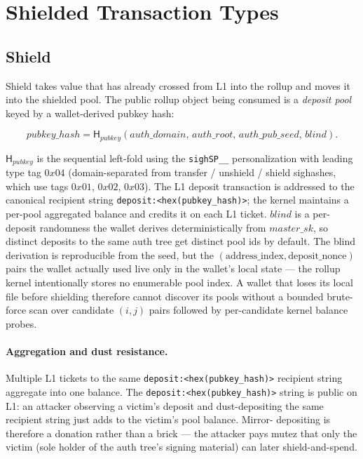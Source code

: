 \documentclass[11pt]{article}
\newcommand{\Hash}{\mathsf{H}}
\begin{document}
\section{Shielded Transaction Types}

\subsection{Shield}

Shield takes value that has already crossed from L1 into the rollup and moves it
into the shielded pool. The public rollup object being consumed is a
\emph{deposit pool} keyed by a wallet-derived pubkey hash:

\[
pubkey\_hash = \Hash_{pubkey}(auth\_domain,\, auth\_root,\, auth\_pub\_seed,\, blind).
\]

\(\Hash_{pubkey}\) is the sequential left-fold using the \texttt{sighSP\_\_}
personalization with leading type tag \(0x04\) (domain-separated from
transfer / unshield / shield sighashes, which use tags \(0x01\), \(0x02\),
\(0x03\)). The L1 deposit transaction is addressed to the canonical
recipient string \texttt{deposit:<hex(pubkey\_hash)>}; the kernel
maintains a per-pool aggregated balance and credits it on each L1 ticket.
\(blind\) is a per-deposit randomness the wallet derives
deterministically from \(master\_sk\), so distinct deposits to the
same auth tree get distinct pool ids by default. The blind derivation
is reproducible from the seed, but the
\((\textrm{address\_index}, \textrm{deposit\_nonce})\) pairs the wallet
actually used live only in the wallet's local state — the rollup
kernel intentionally stores no enumerable pool index. A wallet that
loses its local file before shielding therefore cannot discover its
pools without a bounded brute-force scan over candidate
\((i, j)\) pairs followed by per-candidate kernel balance probes.

\paragraph{Aggregation and dust resistance.} Multiple L1 tickets to the
same \texttt{deposit:<hex(pubkey\_hash)>} recipient string aggregate into
one balance. The \texttt{deposit:<hex(pubkey\_hash)>} string is public on
L1: an attacker observing a victim's deposit and dust-depositing the
same recipient string just adds to the victim's pool balance. Mirror-
depositing is therefore a donation rather than a brick — the attacker pays
mutez that only the victim (sole holder of the auth tree's signing
material) can later shield-and-spend.
\end{document}
